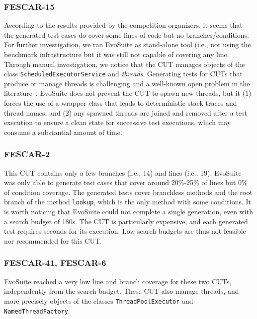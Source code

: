 \documentclass[sigconf]{acmart}
\newcommand{\EVOSUITE}{{\sc EvoSuite}\xspace}
\begin{document}
\subsubsection*{FESCAR-15} According to the results provided by the competition
organizers, it seems that the generated test cases do cover some lines of code
but no branches/conditions.
For further investigation, we ran \EVOSUITE as stand-alone tool (i.e., not using the benchmark infrastructure but it was still not capable of covering any line. Through manual investigation, we notice that the CUT manages objects of the class \texttt{ScheduledExecutorService} and \textit{threads}. Generating tests for CUTs that produce or manage threads is challenging and a well-known open problem in the literature~\cite{FrA13a}. \EVOSUITE does not prevent the CUT to spawn new threads, but it (1) forces the use of a wrapper class that leads to deterministic stack traces and thread names, and (2) any spawned threads are joined and removed after a test execution to ensure a clean state for successive test executions, which may consume a substantial amount of time.


\subsubsection*{FESCAR-2} This CUT contains only a few branches (i.e., 14) and lines (i.e., 19). \EVOSUITE was only able to generate test cases that cover around 20\%-25\% of lines but 0\% of condition coverage. The generated tests cover branchless methods and the root branch of the method \texttt{lookup}, which is the only method with some conditions. It is worth noticing that \EVOSUITE could not complete a single generation, even with a search budget of 180s. The CUT is particularly expensive, and each generated test requires seconds for its execution. Low search budgets are thus not feasible nor recommended for this CUT.

\subsubsection*{FESCAR-41, FESCAR-6} \EVOSUITE reached a very low line and branch coverage for these two CUTs, independently from the search budget. These CUT also manage threads, and more precisely objects of the classes \texttt{ThreadPoolExecutor} and \texttt{NamedThreadFactory}.
\end{document}
